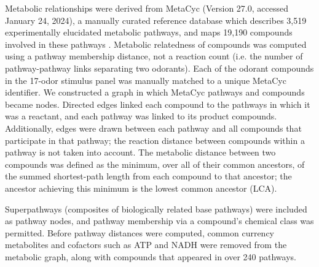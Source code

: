 \documentclass[12pt]{caltech_thesis}
\renewcommand{\cite}{{ }\autocite}
\begin{document}
\begin{refsection}
Metabolic relationships were derived from MetaCyc (Version 27.0, accessed January 24, 2024), a manually curated reference database which describes 3,519 experimentally elucidated metabolic pathways, and maps 19,190 compounds involved in these pathways\cite{MetaCyc}.
Metabolic relatedness of compounds was computed using a pathway membership distance, not a reaction count (i.e. the number of pathway-pathway links separating two odorants).  Each of the odorant compounds in the 17-odor stimulus panel was manually matched to a unique MetaCyc identifier. %
We constructed a graph in which MetaCyc pathways and compounds became nodes.
Directed edges linked each compound to the pathways in which it was a reactant, and each pathway was linked to its product compounds.
Additionally, edges were drawn between each pathway and all compounds that participate in that pathway; the reaction distance between compounds within a pathway is not taken into account.
The metabolic distance between two compounds was defined as the minimum, over all of their common ancestors, of the summed shortest-path length from each compound to that ancestor; the ancestor achieving this minimum is the lowest common ancestor (LCA).

Superpathways (composites of biologically related base pathways) were included as pathway nodes, and pathway membership via a compound’s chemical class was permitted.
Before pathway distances were computed, common currency metabolites and cofactors such as ATP and NADH were removed from the metabolic graph, along with compounds that appeared in over 240 pathways.


\end{refsection}
\end{document}
